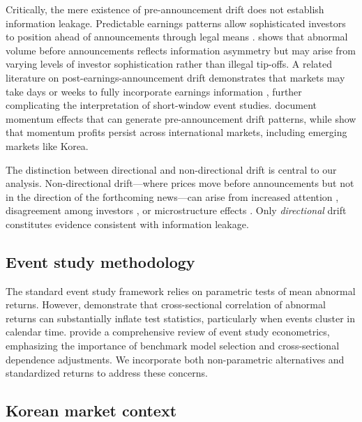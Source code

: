 \documentclass[review,authoryear]{elsarticle}
\begin{document}
Critically, the mere existence of pre-announcement drift does not establish information leakage. Predictable earnings patterns allow sophisticated investors to position ahead of announcements through legal means \citep{atiase1985predisclosure}. \citet{chae2005trading} shows that abnormal volume before announcements reflects information asymmetry but may arise from varying levels of investor sophistication rather than illegal tip-offs. A related literature on post-earnings-announcement drift demonstrates that markets may take days or weeks to fully incorporate earnings information \citep{bernard1989post, bernard1990evidence}, further complicating the interpretation of short-window event studies. \citet{jegadeesh2001profitability} document momentum effects that can generate pre-announcement drift patterns, while \citet{griffin2003momentum} show that momentum profits persist across international markets, including emerging markets like Korea.

The distinction between directional and non-directional drift is central to our analysis. Non-directional drift---where prices move before announcements but not in the direction of the forthcoming news---can arise from increased attention \citep{hirshleifer2003limited}, disagreement among investors \citep{bamber1997trading}, or microstructure effects \citep{hasbrouck2003intraday}. Only \textit{directional} drift constitutes evidence consistent with information leakage.

\subsection{Event study methodology}

The standard event study framework \citep{brown1985using, mackinlay1997event} relies on parametric tests of mean abnormal returns. However, \citet{kolari2010event} demonstrate that cross-sectional correlation of abnormal returns can substantially inflate test statistics, particularly when events cluster in calendar time. \citet{kothari2016econometrics} provide a comprehensive review of event study econometrics, emphasizing the importance of benchmark model selection and cross-sectional dependence adjustments. We incorporate both non-parametric alternatives and standardized returns to address these concerns.

\subsection{Korean market context}
\end{document}
